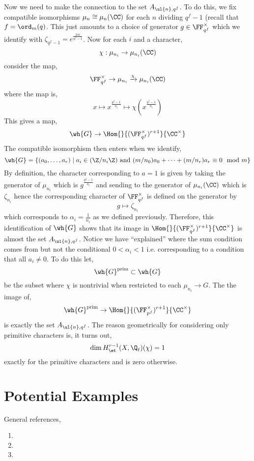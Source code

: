 \documentclass[12pt]{article}
\begin{document}
\bigskip\\
Now we need to make the connection to the set $A_{\ul{n}, q^f}$. To do this, we fix compatible isomorphisms $\mu_n \cong \mu_n(\CC)$ for each $n$ dividing $q^f - 1$ (recall that $f = \ord_m(q)$. This just amounts to a choice of generator $g \in \FF_{q^f}^\times$ which we identify with $\zeta_{q^f-1} = e^{\frac{2 \pi i}{q^f - 1}}$. Now for each $i$ and a character,
\[ \chi : \mu_{n_i} \to \mu_{n_i}(\CC) \]
consider the map,
\[ \FF_{q^f}^\times \to \mu_{n_i} \xrightarrow{\chi} \mu_{n_i}(\CC) \]
where the map is,
\[ x \mapsto x^{\frac{q^f - 1}{n_i}} \mapsto \chi(x^{\frac{q^f - 1}{n_i}}) \]
This gives a map,
\[ \wh{G} \to \Hom{}{(\FF_{q^f}^\times)^{r+1}}{\CC^\times} \]
The compatible isomorphism then enters when we identify,
\[ \wh{G} = \{ (a_0, \dots, a_r) \mid a_i \in (\Z / n_i \Z) \text{ and } (m/n_0) a_0 + \cdots + (m/n_r) a_r \equiv 0 \mod m \} \]
By definition, the character corresponding to $a = 1$ is given by taking the generator of $\mu_{n_i}$ which is $g^{\frac{q^f - 1}{n_i}}$ and sending to the generator of $\mu_{n_i}(\CC)$ which is $\zeta_{n_i}$ hence the corresponding character of $\FF_{q^f}^\times$ is defined on the generator by
\[ g \mapsto \zeta_{n_i} \]
which corresponds to $\alpha_i = \frac{1}{n_i}$ as we defined previously. Therefore, this identification of $\wh{G}$ shows that its image in $\Hom{}{(\FF_{q^f}^\times)^{r+1}}{\CC^\times}$ is almost the set $A_{\ul{n},q^f}$. Notice we have ``explained'' where the sum condition comes from but not the conditional $0 < \alpha_i < 1$ i.e. corresponding to a condition that all $a_i \neq 0$. To do this let,
\[ \wh{G}^{\text{prim}} \subset \wh{G} \]
be the subset where $\chi$ is nontrivial when restricted to each $\mu_{n_i} \to G$. The the image of,
\[ \wh{G}^{\text{prim}} \to \Hom{}{(\FF_{p^f}^\times)^{r+1}}{\CC^\times} \]
is exactly the set $A_{\ul{n}, q^f}$. The reason geometrically for considering only primitive characters is, it turns out, 
\[ \dim H^{r-1}_{\et}(X, \Q_\ell)(\chi) = 1 \]
exactly for the primitive characters and is zero otherwise. 

\section{Potential Examples}

General references,
\begin{enumerate}
\item {}

\item {}

\item {}
\end{enumerate}
\end{document}
